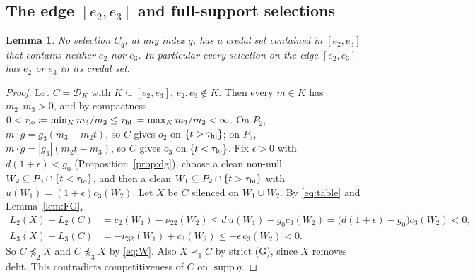 \documentclass[11pt]{article}
\newtheorem{lemma}[theorem]{Lemma}
\theoremstyle{definition}\newtheorem{definition}[theorem]{Definition}
\theoremstyle{remark}\newtheorem{remark}[theorem]{Remark}
\newcommand{\Dscr}{\mathcal D}
\newcommand{\supp}{\operatorname{supp}}
\begin{document}
\subsection{The edge \texorpdfstring{$[e_2,e_3]$}{[e2,e3]} and full-support selections}

\begin{lemma}\label{lem:noedge}
No selection $C_q$, at any index $q$, has a credal set contained in
$[e_2,e_3]$ that contains neither $e_2$ nor $e_3$. In particular every
selection on the edge $[e_2,e_3]$ has $e_2$ or $e_3$ in its credal set.
\end{lemma}
\begin{proof}
Let $C=\Dscr_K$ with $K\subseteq[e_2,e_3]$, $e_2,e_3\notin K$. Then every
$m\in K$ has $m_2,m_3>0$, and by compactness
$0<\tau_{\rm lo}\coloneqq\min_Km_3/m_2\le\tau_{\rm hi}\coloneqq\max_Km_3/m_2<\infty$.
On $P_2$, $m\cdot g=g_3(m_3-m_2t)$, so $C$ gives $o_2$ on $\{t>\tau_{\rm
hi}\}$; on $P_3$, $m\cdot g=|g_3|(m_2t-m_3)$, so $C$ gives $o_3$ on
$\{t<\tau_{\rm lo}\}$. Fix $\epsilon>0$ with $d(1+\epsilon)<g_0$
(Proposition~\ref{prop:dg}), choose a clean non-null $W_2\subseteq
P_3\cap\{t<\tau_{\rm lo}\}$, and then a clean $W_1\subseteq P_2\cap\{t>\tau_{\rm
hi}\}$ with $u(W_1)=(1+\epsilon)c_3(W_2)$. Let $X$ be $C$ silenced on
$W_1\cup W_2$. By \eqref{eq:table} and Lemma~\ref{lem:FG},
\begin{align*}
 L_2(X)-L_2(C)&=c_2(W_1)-\nu_{22}(W_2)\le d\,u(W_1)-g_0c_3(W_2)
 =\bigl(d(1+\epsilon)-g_0\bigr)c_3(W_2)<0,\\
 L_3(X)-L_3(C)&=-\nu_{32}(W_1)+c_3(W_2)\le-\epsilon\,c_3(W_2)<0.
\end{align*}
So $C\not\preceq_2X$ and $C\not\preceq_3X$ by \eqref{eq:W}. Also $X\prec_1C$
by strict (G), since $X$ removes debt. This contradicts competitiveness of
$C$ on $\supp q$.
\end{proof}
\end{document}
